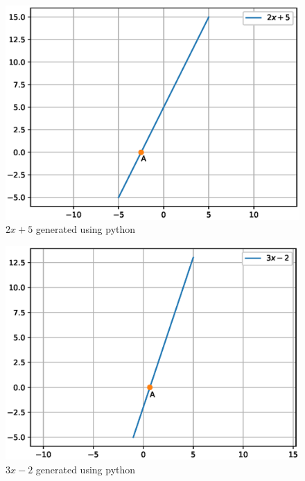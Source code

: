 \begin{enumerate}[label=\thesection.\arabic*.,ref=\thesection.\theenumi]
\begin{figure}[h!]
\centering
\includegraphics[width=\columnwidth]{./figs/eq3.eps}
\caption{$2x + 5$ generated using python}
\label{fig:eq3}
\end{figure} 

\begin{figure}[h!]
\centering
\includegraphics[width=\columnwidth]{./figs/eq4.eps}
\caption{$3x - 2$ generated using python}
\label{fig:eq4}
\end{figure} 


\end{enumerate}
